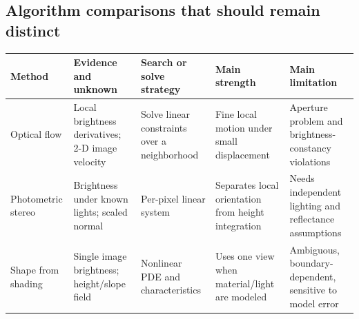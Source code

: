 \subsection{Algorithm comparisons that should remain distinct}\label{04-visual-computing-ii-ch034-algorithm-comparisons-that-should-remain-distinct}

\hypertarget{04-visual-computing-ii-ch034-algorithm-comparisons-that-should-remain-distinct}{}

{\def\LTcaptype{none} %
\begin{longtable}[]{@{}
  >{\raggedright\arraybackslash}p{}
  >{\raggedright\arraybackslash}p{}
  >{\raggedright\arraybackslash}p{}
  >{\raggedright\arraybackslash}p{}
  >{\raggedright\arraybackslash}p{}@{}}
\toprule\noalign{}
\begin{minipage}[b]{\linewidth}\raggedright
Method
\end{minipage} & \begin{minipage}[b]{\linewidth}\raggedright
Evidence and unknown
\end{minipage} & \begin{minipage}[b]{\linewidth}\raggedright
Search or solve strategy
\end{minipage} & \begin{minipage}[b]{\linewidth}\raggedright
Main strength
\end{minipage} & \begin{minipage}[b]{\linewidth}\raggedright
Main limitation
\end{minipage} \\
\midrule\noalign{}
\endhead
\bottomrule\noalign{}
\endlastfoot
Optical flow & Local brightness derivatives; 2-D image velocity & Solve linear constraints over a neighborhood & Fine local motion under small displacement & Aperture problem and brightness-constancy violations \\
Photometric stereo & Brightness under known lights; scaled normal & Per-pixel linear system & Separates local orientation from height integration & Needs independent lighting and reflectance assumptions \\
Shape from shading & Single image brightness; height/slope field & Nonlinear PDE and characteristics & Uses one view when material/light are modeled & Ambiguous, boundary-dependent, sensitive to model error \\

\end{longtable}}
